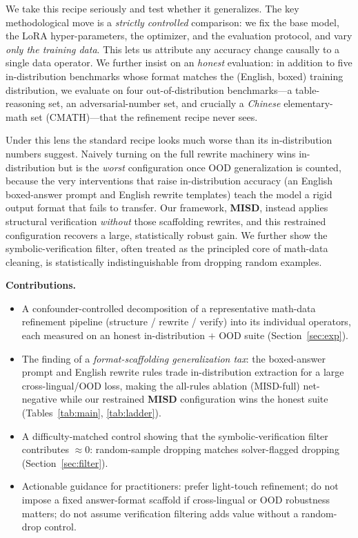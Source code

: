 \documentclass[letterpaper]{article} %
\begin{document}
We take this recipe seriously and test whether it generalizes. The key methodological move is a \emph{strictly controlled} comparison: we fix the base model, the LoRA hyper-parameters, the optimizer, and the evaluation protocol, and vary \emph{only the training data}. This lets us attribute any accuracy change causally to a single data operator. We further insist on an \emph{honest} evaluation: in addition to five in-distribution benchmarks whose format matches the (English, boxed) training distribution, we evaluate on four out-of-distribution benchmarks---a table-reasoning set, an adversarial-number set, and crucially a \emph{Chinese} elementary-math set (CMATH)---that the refinement recipe never sees.

Under this lens the standard recipe looks much worse than its in-distribution numbers suggest. Naively turning on the full rewrite machinery wins in-distribution but is the \emph{worst} configuration once OOD generalization is counted, because the very interventions that raise in-distribution accuracy (an English boxed-answer prompt and English rewrite templates) teach the model a rigid output format that fails to transfer. Our framework, \textbf{MISD}, instead applies structural verification \emph{without} those scaffolding rewrites, and this restrained configuration recovers a large, statistically robust gain. We further show the symbolic-verification filter, often treated as the principled core of math-data cleaning, is statistically indistinguishable from dropping random examples.

\noindent\textbf{Contributions.}
\begin{itemize}\itemsep 1pt
\item A confounder-controlled decomposition of a representative math-data refinement pipeline (structure / rewrite / verify) into its individual operators, each measured on an honest in-distribution $+$ OOD suite (Section~\ref{sec:exp}).
\item The finding of a \emph{format-scaffolding generalization tax}: the boxed-answer prompt and English rewrite rules trade in-distribution extraction for a large cross-lingual/OOD loss, making the all-rules ablation (MISD-full) net-negative while our restrained \textbf{MISD} configuration wins the honest suite (Tables~\ref{tab:main}, \ref{tab:ladder}).
\item A difficulty-matched control showing that the symbolic-verification filter contributes $\approx 0$: random-sample dropping matches solver-flagged dropping (Section~\ref{sec:filter}).
\item Actionable guidance for practitioners: prefer light-touch refinement; do not impose a fixed answer-format scaffold if cross-lingual or OOD robustness matters; do not assume verification filtering adds value without a random-drop control.
\end{itemize}
\end{document}
